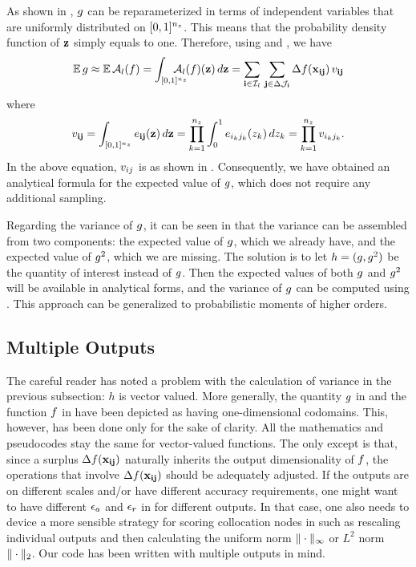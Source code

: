 As shown in , $g$ can be reparameterized in terms of
independent variables that are uniformly distributed on $[0, 1]^{n_z}$. This means
that the probability density function of $\mathbf{z}$ simply equals to one. Therefore,
using  and , we have
\[
  \mathbb{E} \, g \approx \mathbb{E} \, \mathcal{A}_{l}(f) = \int_{[0, 1]^{n_z}} \hspace{-1.5em} \mathcal{A}_{l}(f)(\mathbf{z}) \, d\mathbf{z} = \sum_{\mathbf{i} \in \mathcal{I}_l} \, \sum_{\mathbf{j} \in \Delta\mathcal{J}_{\mathbf{i}}} \Delta f(\mathbf{x}_{\mathbf{i}\mathbf{j}}) \, v_{\mathbf{i}\mathbf{j}}
\]
where
\[
  v_{\mathbf{i}\mathbf{j}} = \int_{[0, 1]^{n_z}} e_{\mathbf{i}\mathbf{j}}(\mathbf{z}) \, d\mathbf{z} = \prod_{k = 1}^{{n_z}} \int_0^1 e_{i_k j_k}(z_k) \, dz_k = \prod_{k = 1}^{{n_z}} v_{i_k j_k}.
\]
In the above equation, $v_{ij}$ is as shown in . Consequently, we
have obtained an analytical formula for the expected value of $g$, which does
not require any additional sampling.

Regarding the variance of $g$, it can be seen in  that the
variance can be assembled from two components: the expected value of $g$, which
we already have, and the expected value of $g^2$, which we are missing. The
solution is to let $h = (g, g^2)$ be the quantity of interest instead of $g$.
Then the expected values of both $g$ and $g^2$ will be available in analytical
forms, and the variance of $g$ can be computed using . This
approach can be generalized to probabilistic moments of higher orders.

\subsection{Multiple Outputs}
The careful reader has noted a problem with the calculation of variance in the
previous subsection: $h$ is vector valued. More generally, the quantity $g$ in
 and the function $f$ in  have been depicted
as having one-dimensional codomains. This, however, has been done only for the
sake of clarity. All the mathematics and pseudocodes stay the same for
vector-valued functions. The only except is that, since a surplus
$\Delta f(\mathbf{x}_{\mathbf{i}\mathbf{j}})$ naturally inherits the output dimensionality of $f$,
the operations that involve $\Delta f(\mathbf{x}_{\mathbf{i}\mathbf{j}})$ should be adequately
adjusted. If the outputs are on different scales and/or have different accuracy
requirements, one might want to have different $\epsilon_a$ and $\epsilon_r$ in
 for different outputs. In that case, one also needs to
device a more sensible strategy for scoring collocation nodes in 
such as rescaling individual outputs and then calculating the uniform norm
$\| \cdot \|_\infty$ or $L^2$ norm $\| \cdot \|_2$. Our code \cite{sources}
has been written with multiple outputs in mind.

